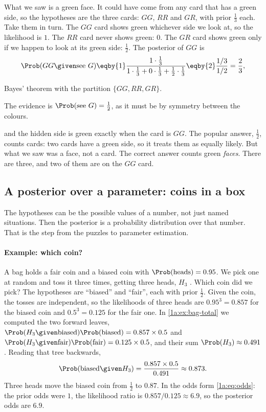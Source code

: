 What we saw is a green face. It could have come from any card that has a green
side, so the hypotheses are the three cards: $GG$, $RR$ and $GR$, with prior
$\tfrac13$ each. Take them in turn. The $GG$ card shows green whichever side we
look at, so the likelihood is $1$. The $RR$ card never shows green: $0$. The $GR$
card shows green only if we happen to look at its green side: $\tfrac12$. The
posterior of $GG$ is
\begin{align*}
\Prob(GG\given\text{see }G)
\eqby{1}\frac{1\cdot\tfrac13}{1\cdot\tfrac13+0\cdot\tfrac13+\tfrac12\cdot\tfrac13}
\eqby{2}\frac{1/3}{1/2}=\frac23,
\end{align*}
\begin{explain}
  \item Bayes' theorem with the partition $\{GG,RR,GR\}$.
  \item The evidence is $\Prob(\text{see }G)=\tfrac12$, as it must be by symmetry
        between the colours.
\end{explain}
and the hidden side is green exactly when the card is $GG$. The popular answer,
$\tfrac12$, counts cards: two cards have a green side, so it treats them as
equally likely. But what we saw was a face, not a card. The correct answer
counts green \emph{faces}. There are three, and two of them are on the $GG$
card.

\subsection{A posterior over a parameter: coins in a box}

The hypotheses can be the possible values of a number, not just named
situations. Then the posterior is a probability distribution over that number.
That is the step from the puzzles to parameter estimation.

\paragraph{Example: which coin?}
A bag holds a fair coin and a biased coin with $\Prob(\text{heads})=0.95$. We pick
one at random and toss it three times, getting three heads, $H_3$
. Which coin did we pick? The hypotheses are
``biased'' and ``fair'', each with prior $\tfrac12$. Given the coin, the tosses
are independent, so the likelihoods of three heads are $0.95^3=0.857$ for the
biased coin and $0.5^3=0.125$ for the fair one. In \cref{1a:ex:bag-total} we
computed the two forward leaves,
$\Prob(H_3\given\text{biased})\Prob(\text{biased})=0.857\times0.5$ and
$\Prob(H_3\given\text{fair})\Prob(\text{fair})=0.125\times0.5$, and their sum
$\Prob(H_3)\approx0.491$. Reading that tree backwards,
\begin{align*}
\Prob(\text{biased}\given H_3)=\frac{0.857\times0.5}{0.491}\approx0.873 .
\end{align*}
Three heads move the biased coin from $\tfrac12$ to $0.87$. In the odds form
\eqref{1a:eq:odds}: the prior odds were $1$, the likelihood ratio is
$0.857/0.125\approx6.9$, so the posterior odds are $6.9$.

